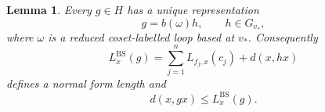 \documentclass[10pt,a4paper]{amsart}
\newtheorem{lemma}{Lemma}
\newcommand{\BS}{\mathrm{BS}}
\begin{document}
\begin{lemma}
\label{lem:bass-serre-normal-form}
Every $g\in H$ has a unique representation
\begin{equation}\label{eq:bass-serre-normal-form}
 g=b(\omega)h,
 \qquad h\in G_{v_*},
\end{equation}
where $\omega$ is a reduced coset-labelled loop based at $v_*$.  Consequently
\begin{equation}\label{eq:bass-serre-length}
 L^{\BS}_x(g)=\sum_{j=1}^nL_{f_j,x}(c_j)+d(x,hx)
\end{equation}
defines a normal form length and
\begin{equation}\label{eq:bass-serre-subadditive-upper}
 d(x,gx)\le L^{\BS}_x(g).
\end{equation}
\end{lemma}
\end{document}
